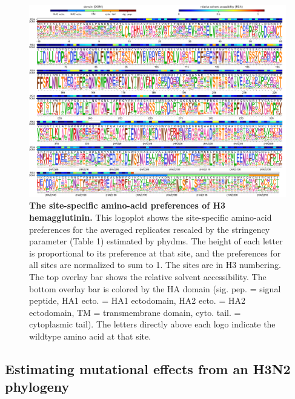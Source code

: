 \documentclass[11pt]{article}
\begin{document}
\begin{figure}
\centerline{\includegraphics[width=\textwidth]{figs/prefslogoplot/rescaled-avgprefs_prefs.pdf}}
\caption{\label{fig:logoplot}
{\bf The site-specific amino-acid preferences of H3 hemagglutinin.}
This logoplot shows the site-specific amino-acid preferences for the averaged replicates rescaled by the stringency parameter (Table 1) estimated by phydms.
The height of each letter is proportional to its preference at that site, and the preferences for all sites are normalized to sum to 1.
The sites are in H3 numbering.
The top overlay bar shows the relative solvent accessibility.
The bottom overlay bar is colored by the HA domain (sig. pep. = signal peptide, HA1 ecto. = HA1 ectodomain, HA2 ecto. = HA2 ectodomain, TM = transmembrane domain, cyto. tail. = cytoplasmic tail).
The letters directly above each logo indicate the wildtype amino acid at that site.
}
\end{figure}


\subsection*{Estimating mutational effects from an H3N2 phylogeny}
\end{document}
